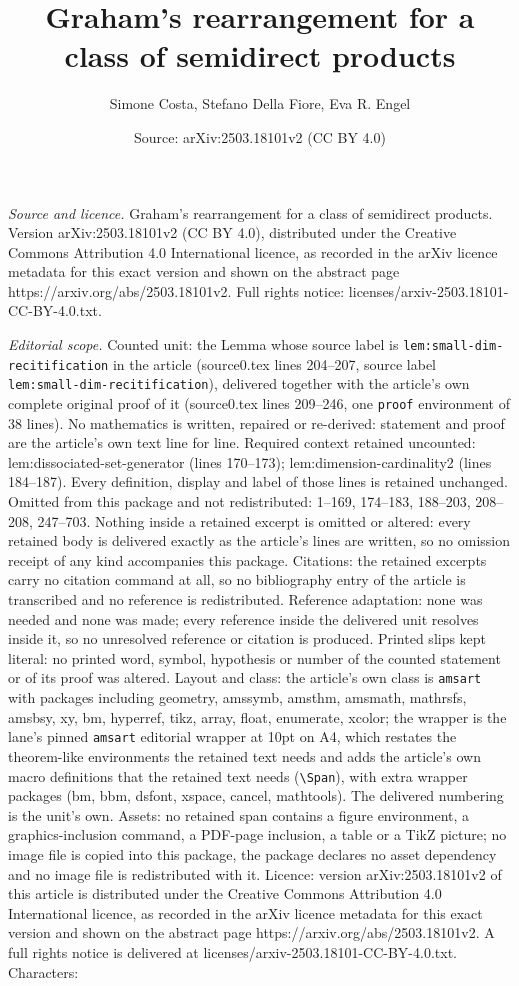 \documentclass[10pt,a4paper]{amsart}
\title[Graham's rearrangement for a class of semidirect products]{Graham's rearrangement for a class of semidirect products}
\author{Simone Costa, Stefano Della Fiore, Eva R. Engel}
\date{Source: arXiv:2503.18101v2 (CC BY 4.0)}
\begin{document}
\maketitle

\noindent\emph{Source and licence.} Graham's rearrangement for a class of semidirect products. Version arXiv:2503.18101v2 (CC BY 4.0), distributed under the Creative Commons Attribution 4.0 International licence, as recorded in the arXiv licence metadata for this exact version and shown on the abstract page https://arxiv.org/abs/2503.18101v2. Full rights notice: licenses/arxiv-2503.18101-CC-BY-4.0.txt.\par\smallskip

\noindent\textit{Editorial scope.} Counted unit: the Lemma whose source label is \texttt{lem:small-dim-recitification} in the article (source0.tex lines 204--207, source label \texttt{lem:small-dim-recitification}), delivered together with the article's own complete original proof of it (source0.tex lines 209--246, one \texttt{proof} environment of 38 lines). No mathematics is written, repaired or re-derived: statement and proof are the article's own text line for line. Required context retained uncounted: lem:dissociated-set-generator (lines 170--173); lem:dimension-cardinality2 (lines 184--187). Every definition, display and label of those lines is retained unchanged. Omitted from this package and not redistributed: 1--169, 174--183, 188--203, 208--208, 247--703. Nothing inside a retained excerpt is omitted or altered: every retained body is delivered exactly as the article's lines are written, so no omission receipt of any kind accompanies this package. Citations: the retained excerpts carry no citation command at all, so no bibliography entry of the article is transcribed and no reference is redistributed. Reference adaptation: none was needed and none was made; every reference inside the delivered unit resolves inside it, so no unresolved reference or citation is produced. Printed slips kept literal: no printed word, symbol, hypothesis or number of the counted statement or of its proof was altered. Layout and class: the article's own class is \texttt{amsart} with packages including geometry, amssymb, amsthm, amsmath, mathrsfs, amsbsy, xy, bm, hyperref, tikz, array, float, enumerate, xcolor; the wrapper is the lane's pinned \texttt{amsart} editorial wrapper at 10pt on A4, which restates the theorem-like environments the retained text needs and adds the article's own macro definitions that the retained text needs (\texttt{\textbackslash Span}), with extra wrapper packages (bm, bbm, dsfont, xspace, cancel, mathtools). The delivered numbering is the unit's own. Assets: no retained span contains a figure environment, a graphics-inclusion command, a PDF-page inclusion, a table or a TikZ picture; no image file is copied into this package, the package declares no asset dependency and no image file is redistributed with it. Licence: version arXiv:2503.18101v2 of this article is distributed under the Creative Commons Attribution 4.0 International licence, as recorded in the arXiv licence metadata for this exact version and shown on the abstract page https://arxiv.org/abs/2503.18101v2. A full rights notice is delivered at licenses/arxiv-2503.18101-CC-BY-4.0.txt. Characters: 
\end{document}
